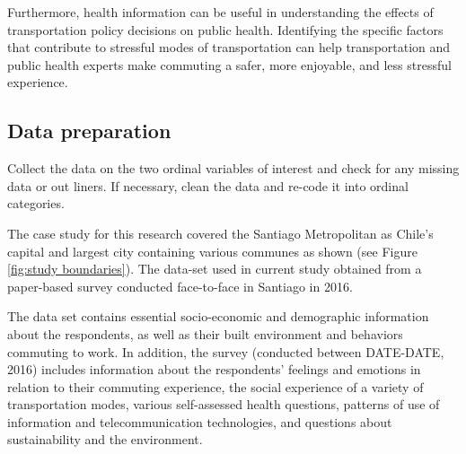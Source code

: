 \documentclass[
11pt, %
oneside, %
english, %
singlespacing, %
]{macthesis} %
\begin{document}
Furthermore, health information can be useful in understanding the effects of transportation policy decisions on public health. Identifying the specific factors that contribute to stressful modes of transportation can help transportation and public health experts make commuting a safer, more enjoyable, and less stressful experience.

\hypertarget{data-preparation}{%
\subsection{Data preparation}\label{data-preparation}}

Collect the data on the two ordinal variables of interest and check for any missing data or out liners. If necessary, clean the data and re-code it into ordinal categories.

The case study for this research covered the Santiago Metropolitan as Chile's capital and largest city containing various communes as shown (see Figure \ref{fig:study boundaries}). The data-set used in current study obtained from a paper-based survey conducted face-to-face in Santiago in 2016.

The data set contains essential socio-economic and demographic information about the respondents, as well as their built environment and behaviors commuting to work. In addition, the survey (conducted between DATE-DATE, 2016) includes information about the respondents' feelings and emotions in relation to their commuting experience, the social experience of a variety of transportation modes, various self-assessed health questions, patterns of use of information and telecommunication technologies, and questions about sustainability and the environment.
\end{document}

